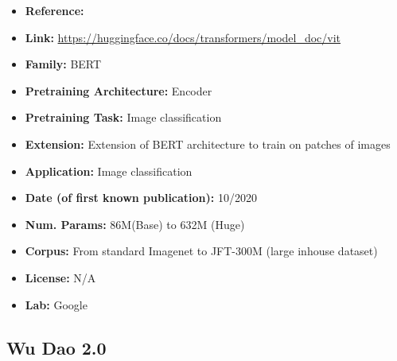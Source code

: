 \documentclass{article}
\begin{document}
            \begin{itemize}
                 \item \textbf{Reference:} 
                 \item \textbf{Link:} \url{https://huggingface.co/docs/transformers/model_doc/vit}
                 \item \textbf{Family:} BERT
                \item \textbf{Pretraining Architecture:} Encoder
                \item \textbf{Pretraining Task:} Image classification
                \item \textbf{Extension:} Extension of BERT architecture to train on patches of images
                \item \textbf{Application:} Image classification
                \item \textbf{Date (of first known publication):} 10/2020
                \item \textbf{Num. Params:} 86M(Base) to 632M (Huge)
                \item \textbf{Corpus:} From standard Imagenet to JFT-300M (large inhouse dataset)
                \item \textbf{License:} N/A
                \item \textbf{Lab:} Google
            \end{itemize}

\subsection{Wu Dao 2.0}
\end{document}
